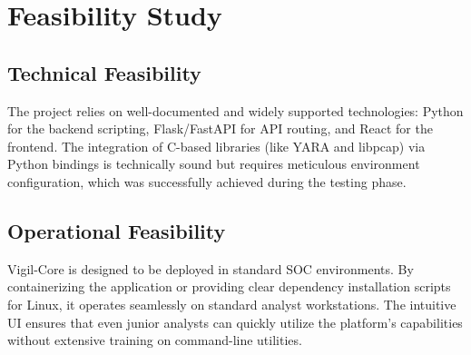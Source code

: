 \section{Feasibility Study}
\subsection{Technical Feasibility}
The project relies on well-documented and widely supported technologies: Python for the backend scripting, Flask/FastAPI for API routing, and React for the frontend. The integration of C-based libraries (like YARA and libpcap) via Python bindings is technically sound but requires meticulous environment configuration, which was successfully achieved during the testing phase.

\subsection{Operational Feasibility}
Vigil-Core is designed to be deployed in standard SOC environments. By containerizing the application or providing clear dependency installation scripts for Linux, it operates seamlessly on standard analyst workstations. The intuitive UI ensures that even junior analysts can quickly utilize the platform's capabilities without extensive training on command-line utilities.
